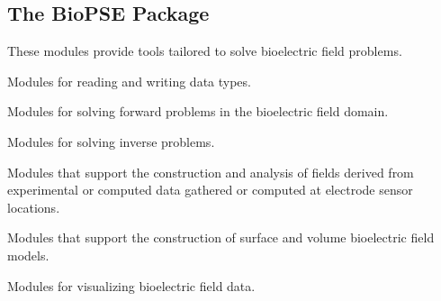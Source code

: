 \subsection{The BioPSE Package}
\label{sec:biopsepackage}


These modules provide  tools tailored to solve bioelectric field
problems.

\begin{description}
   Modules for reading and writing \sr{}
  data types.
  
   Modules for solving forward
  problems in the bioelectric field domain.
  
   Modules for solving inverse
  problems.
  
   Modules that support
  the construction and analysis of fields derived from experimental or
  computed data gathered or computed at electrode sensor locations.
  
   Modules that support the
  construction of surface and volume bioelectric field models.
  
   Modules for visualizing
  bioelectric field data.
\end{description}

